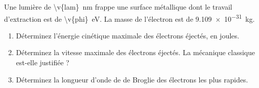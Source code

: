 Une lumière de \qty{\v{lam}}{nm} frappe une surface métallique dont le travail d'extraction est de \qty{\v{phi}}{eV}. La masse de l'électron est de \qty{9.109e-31}{kg}.

\begin{enumerate}[label=\alph*)]
    \item Déterminez l'énergie cinétique maximale des électrons éjectés, en joules.
    \item Déterminez la vitesse maximale des électrons éjectés. La mécanique classique est-elle justifiée ?
    \item Déterminez la longueur d'onde de de Broglie des électrons les plus rapides.
\end{enumerate}

